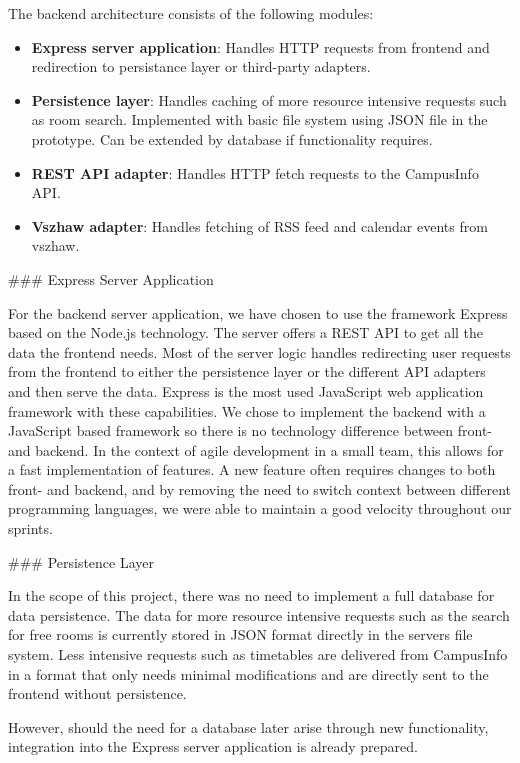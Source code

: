 \begin{markdown}
The backend architecture consists of the following modules:

\begin{itemize}
  \item \textbf{Express server application}: Handles HTTP requests from frontend and redirection to persistance layer or third-party adapters.
  \item \textbf{Persistence layer}: Handles caching of more resource intensive requests such as room search. Implemented with basic file system using JSON file in the prototype. Can be extended by database if functionality requires.
  \item \textbf{REST API adapter}: Handles HTTP fetch requests to the CampusInfo API.
  \item \textbf{Vszhaw adapter}: Handles fetching of RSS feed and calendar events from vszhaw.
\end{itemize}

### Express Server Application

For the backend server application, we have chosen to use the framework Express \cite{Express} based on the Node.js \cite{Node} technology. The server offers a REST API to get all the data the frontend needs. Most of the server logic handles redirecting user requests from the frontend to either the persistence layer or the different API adapters and then serve the data. Express is the most used JavaScript web application framework with these capabilities. We chose to implement the backend with a JavaScript based framework so there is no technology difference between front- and backend. In the context of agile development in a small team, this allows for a fast implementation of features. A new feature often requires changes to both front- and backend, and by removing the need to switch context between different programming languages, we were able to maintain a good velocity throughout our sprints.

### Persistence Layer

In the scope of this project, there was no need to implement a full database for data persistence. The data for more resource intensive requests such as the search for free rooms is currently stored in JSON format directly in the servers file system. Less intensive requests such as timetables are delivered from CampusInfo in a format that only needs minimal modifications and are directly sent to the frontend without persistence.

However, should the need for a database later arise through new functionality, integration into the Express server application is already prepared.


\end{markdown}
